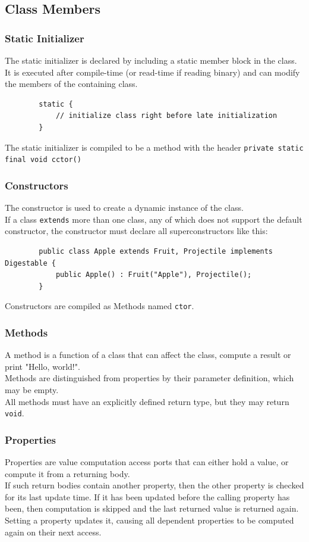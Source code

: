 \documentclass{docs}
\begin{document}
    \subsection{Class Members}
    
    \subsubsection{Static Initializer}
    The static initializer is declared by including a static member block in the class. \\
    It is executed after compile-time (or read-time if reading binary) and can modify the members of the containing class.
    \begin{verbatim}
        static {
            // initialize class right before late initialization
        }
    \end{verbatim}
    The static initializer is compiled to be a method with the header \texttt{private static final void cctor()}
    
    \subsubsection{Constructors}
    The constructor is used to create a dynamic instance of the class. \\
    If a class \texttt{extends} more than one class, any of which does not support the default constructor, the constructor must declare all superconstructors like this:
    \begin{verbatim}
        public class Apple extends Fruit, Projectile implements Digestable {
            public Apple() : Fruit("Apple"), Projectile();
        }
    \end{verbatim}
    Constructors are compiled as Methods named \texttt{ctor}.
    
    \subsubsection{Methods}
    A method is a function of a class that can affect the class, compute a result or print "Hello, world!". \\
    Methods are distinguished from properties by their parameter definition, which may be empty. \\
    All methods must have an explicitly defined return type, but they may return \texttt{void}.
    
    \subsubsection{Properties}
    Properties are value computation access ports that can either hold a value, or compute it from a returning body. \\
    If such return bodies contain another property, then the other property is checked for its last update time. If it has been updated before the calling property has been, then computation is skipped and the last returned value is returned again.
    Setting a property updates it, causing all dependent properties to be computed again on their next access.
    
\end{document}
